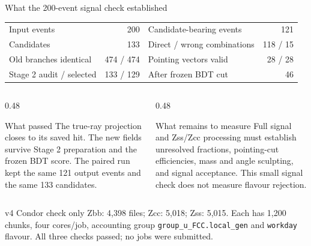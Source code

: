 \documentclass[aspectratio=169,10pt]{beamer}
\begin{document}
\begin{frame}{What the 200-event signal check established}
\small
\begin{center}
\begin{tabular}{lr@{\qquad}lr}
\toprule
Input events & 200 & Candidate-bearing events & 121\\
Candidates & 133 & Direct / wrong combinations & 118 / 15\\
Old branches identical & 474 / 474 & Pointing vectors valid & 28 / 28\\
Stage 2 audit / selected & 133 / 129 & After frozen BDT cut & 46\\
\bottomrule
\end{tabular}
\end{center}
\vspace{0.25cm}
\begin{columns}[T,onlytextwidth]
\begin{column}{0.48\textwidth}
\begin{block}{What passed}
The true-ray projection closes to its saved hit. The new fields survive Stage 2 preparation and the frozen BDT score. The paired run kept the same 121 output events and the same 133 candidates.
\end{block}
\end{column}\hfill
\begin{column}{0.48\textwidth}
\begin{block}{What remains to measure}
Full signal and Zss/Zcc processing must establish unresolved fractions, pointing-cut efficiencies, mass and angle sculpting, and signal acceptance. This small signal check does not measure flavour rejection.
\end{block}
\end{column}
\end{columns}
\vspace{0.15cm}
\begin{block}{v4 Condor check only}
Zbb: 4,398 files; Zcc: 5,018; Zss: 5,015. Each has 1,200 chunks, four cores/job, accounting group \texttt{group\_u\_FCC.local\_gen} and \texttt{workday} flavour. All three checks passed; no jobs were submitted.
\end{block}
\end{frame}
\end{document}
